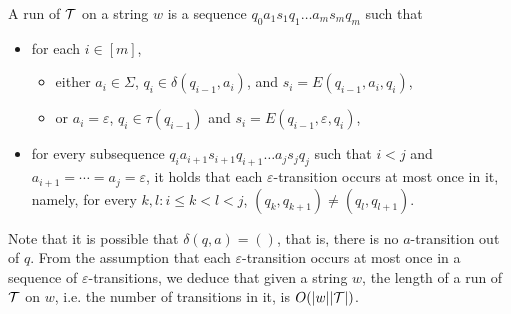 A run of $\mathcal{T}$ on a string $w$ is a sequence $q_0 a_1 s_1 q_1 \ldots a_m s_m q_m$ such that
\begin{itemize}
%
\item for each $i \in [m]$, 
\begin{itemize}
\item either $a_i \in \Sigma$, $q_i \in \delta (q_{i-1}, a_i)$, and $s_i = E (q_{i - 1}, a_i, q_i)$, 
\item or $a_i = \varepsilon$, $q_i \in \tau(q_{i-1})$ and $s_i = E (q_{i - 1}, \varepsilon, q_i)$,
\end{itemize}

\item for every subsequence $q_i a_{i+1} s_{i+1} q_{i+1} \ldots a_{j} s_j q_j$ such that  $i < j$ and $a_{i+1} = \cdots = a_j = \varepsilon$,  it holds that each $\varepsilon$-transition occurs at most once in it, namely, for every $k, l: i \le k < l < j$, $(q_k, q_{k+1}) \neq (q_l, q_{l+1})$.
\end{itemize}
Note that it is possible that $\delta(q, a) = ()$, that is, there is no $a$-transition out of $q$. 
From the assumption that each $\varepsilon$-transition occurs at most once in a sequence of $\varepsilon$-transitions, we deduce that given a string $w$, the length of a run of $\mathcal{T}$ on $w$, i.e. the number of transitions in it, is $O(|w||\mathcal{T}|)$. 

